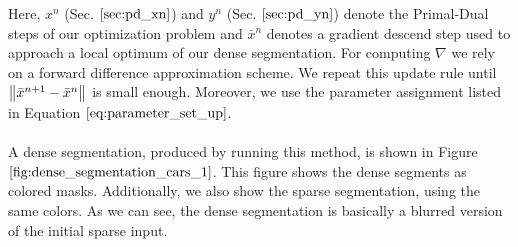 Here, $x^n$ (Sec. $\ref{sec:pd_xn}$) and $y^n$ (Sec. $\ref{sec:pd_yn}$) denote the Primal-Dual steps of our optimization problem and $\bar{x}^n$ denotes a gradient descend step used to approach a local optimum of our dense segmentation. For computing $\nabla$ we rely on a forward difference approximation scheme. We repeat this update rule until $\left\lVert\bar{x}^{n+1} - \bar{x}^{n}\right\rVert$ is small enough. Moreover, we use the parameter assignment listed in Equation $\ref{eq:parameter_set_up}$. \\ \\
A dense segmentation, produced by running this method, is shown in Figure $\ref{fig:dense_segmentation_cars_1}$. This figure shows the dense segments as colored masks. Additionally, we also show the sparse segmentation, using the same colors. As we can see, the dense segmentation is basically a blurred version of the initial sparse input. 